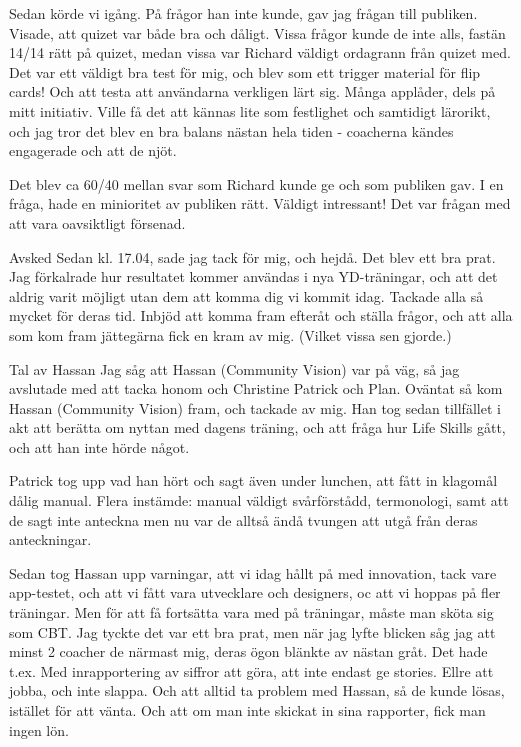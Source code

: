Sedan körde vi igång. På frågor han inte kunde, gav jag frågan till publiken. Visade, att quizet var både bra och dåligt. Vissa frågor kunde de inte alls, fastän 14/14 rätt på quizet, medan vissa var Richard väldigt ordagrann från quizet med.
  Det var ett väldigt bra test för mig, och blev som ett trigger material för flip cards! Och att testa att användarna verkligen lärt sig. Många applåder, dels på mitt initiativ. Ville få det att kännas lite som festlighet och samtidigt lärorikt, och jag tror det blev en bra balans nästan hela tiden - coacherna kändes engagerade och att de njöt.

Det blev ca 60/40 mellan svar som Richard kunde ge och som publiken gav. I en fråga, hade en minioritet av publiken rätt. Väldigt intressant! Det var frågan med att vara oavsiktligt försenad.

Avsked
Sedan kl. 17.04, sade jag tack för mig, och hejdå. Det blev ett bra prat. Jag förkalrade hur resultatet kommer användas i nya YD-träningar, och att det aldrig varit möjligt utan dem att komma dig vi kommit idag. Tackade alla så mycket för deras tid. Inbjöd att komma fram efteråt och ställa frågor, och att alla som kom fram jättegärna fick en kram av mig. (Vilket vissa sen gjorde.)

Tal av Hassan
Jag såg att Hassan (Community Vision) var på väg, så jag avslutade med att tacka honom och Christine Patrick och Plan. Oväntat så kom Hassan (Community Vision) fram, och tackade av mig. Han tog sedan tillfället i akt att berätta om nyttan med dagens träning, och att fråga hur Life Skills gått, och att han inte hörde något.

Patrick tog upp vad han hört och sagt även under lunchen, att fått in klagomål dålig manual. Flera instämde: manual väldigt svårförstådd, termonologi, samt att de sagt inte anteckna men nu var de alltså ändå tvungen att utgå från deras anteckningar.

Sedan tog Hassan upp varningar, att vi idag hållt på med innovation, tack vare app-testet, och att vi fått vara utvecklare och designers, oc att vi hoppas på fler träningar. Men för att få fortsätta vara med på träningar, måste man sköta sig som CBT. Jag tyckte det var ett bra prat, men när jag lyfte blicken såg jag att minst 2 coacher de närmast mig, deras ögon blänkte av nästan gråt. Det hade t.ex. Med inrapportering av siffror att göra, att inte endast ge stories. Ellre att jobba, och inte slappa. Och att alltid ta problem med Hassan, så de kunde lösas, istället för att vänta. Och att om man inte skickat in sina rapporter, fick man ingen lön.


